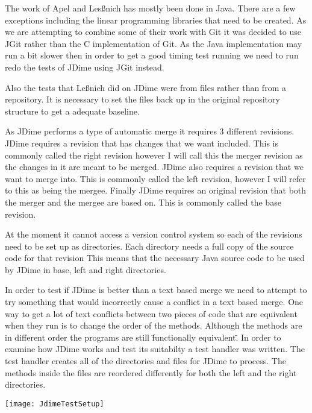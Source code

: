 The work of Apel and Les{\ss}nich has mostly been done in Java.  There are a few exceptions including the linear programming libraries that need to be created.  As we are attempting to combine some of their work with Git it was decided to use JGit rather than the C implementation of Git. As the Java implementation may run a bit slower then in order to get a good timing test running we need to run redo the tests of JDime using JGit instead. 

Also the tests that Le{\ss}nich did on JDime were from files rather than from a repository. It is necessary to set the files back up in the original repository structure to get a adequate baseline.

As JDime performs a type of automatic merge it requires 3 different revisions.
JDime requires a revision that has changes that we want included.  This is commonly called the right revision however I will call this the merger revision as the changes in it are meant to be merged.
JDime also requires a revision that we want to merge into.  This is commonly called the left revision, however I will refer to this as being the mergee. 
Finally JDime requires an original revision that both the merger and the mergee are based on.
This is commonly called the base revision.

At the moment it cannot access a version control system so each of the revisions need to be set up as directories.
Each directory needs a full copy of the source code for that revision 
This means that the necessary Java source code to be used by JDime in base, left and right directories.


In order to test if JDime is better than a text based merge we need to attempt to try something that would incorrectly cause a conflict in a text based merge.
One way to get a lot of text conflicts between two pieces of code that are equivalent when they run is to change the order of the methods.
Although the methods are in different order the programs are still \"functionally equivalent\".
In order to examine how JDime works and test its suitabilty a test handler was written.
The test handler creates all of the directories and files for JDime to process.
The methods inside the files are reordered differently for both the left and the right directories.

\begin{center}
\texttt{[image: JdimeTestSetup]}
\end{center}

